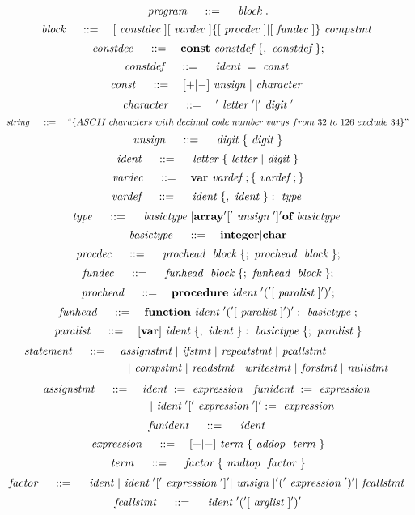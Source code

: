 \[
	~\emph{program}~ \quad ::= \quad 
		~\emph{block}~.
\]
\[
	~\emph{block}~ \quad ::= \quad 
		[~\emph{constdec}~] [~\emph{vardec}~] \{[~\emph{procdec}~] | [~\emph{fundec}~]\} ~\emph{compstmt}~
\]
\[
	~\emph{constdec}~ \quad ::= \quad
		\textbf{const} ~\emph{constdef}~ \{,~\emph{constdef}~\};	
\]
\[
	~\emph{constdef}~ \quad ::= \quad
		~\emph{ident}~ = ~\emph{const}~
\]
\[
	~\emph{const}~ \quad ::= \quad
		[+|-]~\emph{unsign}~|~\emph{character}~
\]
\[
	~\emph{character}~ \quad ::= \quad
		'~\emph{letter}~' | '~\emph{digit}~'
\]
\[
	~\emph{string}~ \quad ::= \quad
		``\{ASCII~characters~with~decimal~code~number~varys~from~32~to~126~exclude~34\}"
\]
\[
	~\emph{unsign}~ \quad ::= \quad
		~\emph{digit}~ \{~\emph{digit}~\}
\]
\[
	~\emph{ident}~ \quad ::= \quad
		~\emph{letter}~ \{ ~\emph{letter}~ | ~\emph{digit}~ \}
\]
\[
	~\emph{vardec}~ \quad ::= \quad
		\textbf{var} ~\emph{vardef}~; \{ ~\emph{vardef}~; \}
\]
\[
	~\emph{vardef}~ \quad ::= \quad
		~\emph{ident}~\{,~\emph{ident}~\}:~\emph{type}~
\]
\[
	~\emph{type}~ \quad ::= \quad
		~\emph{basictype}~ | \textbf{array} '['~\emph{unsign}~']' \textbf{of} ~\emph{basictype}~
\]
\[
	~\emph{basictype}~ \quad ::= \quad
		\textbf{integer} | \textbf{char}
\]
\[
	~\emph{procdec}~ \quad ::= \quad
		~\emph{prochead}~ ~\emph{block}~ \{; ~\emph{prochead}~ ~\emph{block}~ \};
\]
\[
	~\emph{fundec}~ \quad ::= \quad
		~\emph{funhead}~ ~\emph{block}~ \{; ~\emph{funhead}~ ~\emph{block}~ \};
\]
\[
	~\emph{prochead}~ \quad ::= \quad
		\textbf{procedure} ~\emph{ident}~ '(' [~\emph{paralist}~] ')';
\]
\[
	~\emph{funhead}~ \quad ::= \quad
		\textbf{function} ~\emph{ident}~ '(' [~\emph{paralist}~] ')': ~\emph{basictype}~;
\]
\[
	~\emph{paralist}~ \quad ::= \quad
		[ \textbf{var} ] ~\emph{ident}~ \{, ~\emph{ident}~ \}: ~\emph{basictype}~ \{; ~\emph{paralist}~ \}
\]
\[ \begin{aligned}
	~\emph{statement}~ \quad ::= \quad
		& ~\emph{assignstmt}~ | ~\emph{ifstmt}~ | ~\emph{repeatstmt}~ | ~\emph{pcallstmt}~ \\
		& \quad | ~\emph{compstmt}~ | ~\emph{readstmt}~ | ~\emph{writestmt}~ | ~\emph{forstmt}~ | ~\emph{nullstmt}~
\end{aligned} \]
\[ \begin{aligned}
	~\emph{assignstmt}~ \quad ::= \quad
		& ~\emph{ident}~ := ~\emph{expression}~ | ~\emph{funident}~ := ~\emph{expression}~  \\
		& \quad | ~\emph{ident}~ '[' ~\emph{expression}~ ']' := ~\emph{expression}~
\end{aligned} \]
\[
	~\emph{funident}~ \quad ::= \quad
		~\emph{ident}~
\]
\[
	~\emph{expression}~ \quad ::= \quad
		[+|-] ~\emph{term}~ \{ ~\emph{addop}~ ~\emph{term}~ \}
\]
\[
	~\emph{term}~ \quad ::= \quad
		~\emph{factor}~ \{ ~\emph{multop}~ ~\emph{factor}~ \}
\]
\[
	~\emph{factor}~ \quad ::= \quad
		~\emph{ident}~ | ~\emph{ident}~ '[' ~\emph{expression}~ ']' | ~\emph{unsign}~ |
			'(' ~\emph{expression}~ ')' | ~\emph{fcallstmt}~
\]
\[
	~\emph{fcallstmt}~ \quad ::= \quad
		~\emph{ident}~ '('[ ~\emph{arglist}~ ]')'
\]
